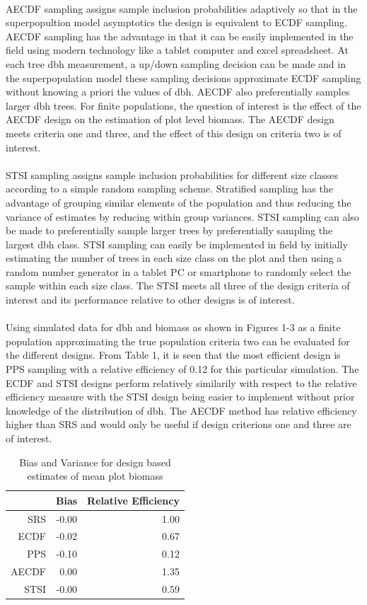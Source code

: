 \documentclass[fleqn]{article}
\begin{document}
\\
AECDF sampling assigns sample inclusion probabilities adaptively so that in the superpopultion model asymptotics the design is equivalent to ECDF sampling. AECDF sampling has the advantage in that it can be easily implemented in the field using modern technology like a tablet computer and excel spreadsheet. At each tree dbh measurement, a up/down sampling decision can be made and in the superpopulation model these sampling decisions approximate ECDF sampling without knowing a priori the values of dbh. AECDF also preferentially samples larger dbh trees. For finite populations, the question of interest is the effect of the AECDF design on the estimation of plot level biomass. The AECDF design meets criteria one and three, and the effect of this design on criteria two is of interest.\\
\\
STSI sampling assigns sample inclusion probabilities for different size classes according to a simple random sampling scheme. Stratified sampling has the advantage of grouping similar elements of the population and thus reducing the variance of estimates by reducing within group variances. STSI sampling can also be made to preferentially sample larger trees by preferentially sampling the largest dbh class. STSI sampling can easily be implemented in field by initially estimating the number of trees in each size class on the plot and then using a random number generator in a tablet PC or smartphone to randomly select the sample within each size class. The STSI meets all three of the design criteria of interest and its performance relative to other designs is of interest.\\
\\
Using simulated data for dbh and biomass as shown in Figures 1-3 as a finite population approximating the true population criteria two can be evaluated for the different designs. From Table 1, it is seen that the most efficient design is PPS sampling with a relative efficiency of 0.12 for this particular simulation. The ECDF and STSI designs perform relatively similarily with respect to the relative efficiency measure with the STSI design being easier to implement without prior knowledge of the distribution of dbh. The AECDF method has relative efficiency higher than SRS and would only be useful if design criterions one and three are of interest.\\
\begin{table}
\centering
\caption{Bias and Variance for design based estimates of mean plot biomass}
\begin{tabular}{rrr}
  \hline
 & Bias & Relative Efficiency \\ 
  \hline
SRS & -0.00 & 1.00 \\ 
  ECDF & -0.02 & 0.67 \\ 
  PPS & -0.10 & 0.12 \\ 
  AECDF & 0.00 & 1.35 \\ 
  STSI & -0.00 & 0.59 \\ 
   \hline
\end{tabular}
\end{table}
%
\end{document}
